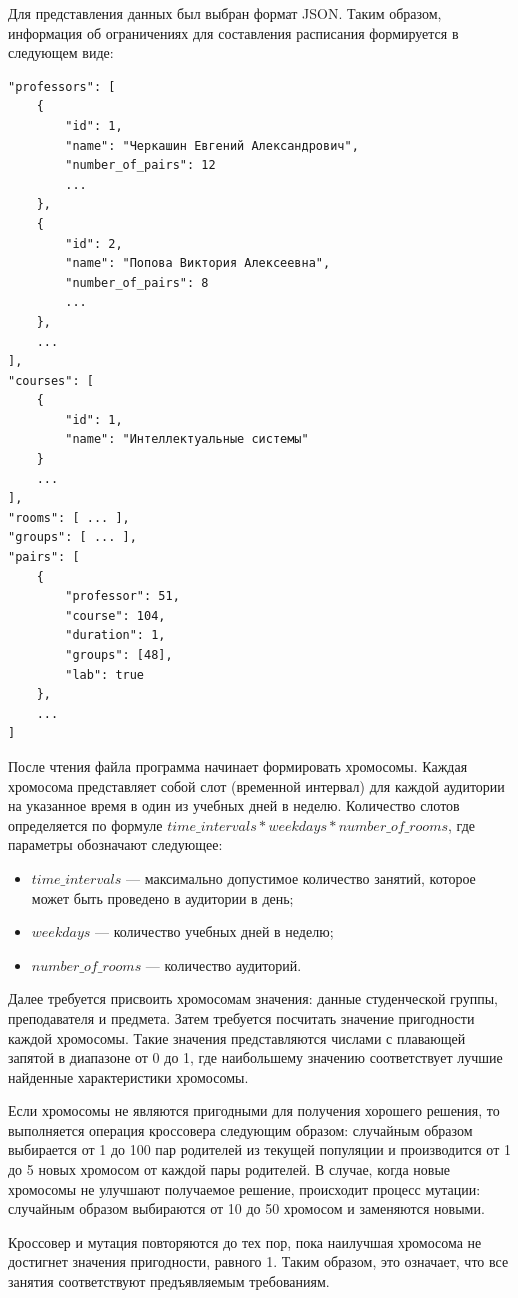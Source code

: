\documentclass[
]{aiitart}
\begin{document}
Для представления данных был выбран формат JSON. Таким образом, информация об ограничениях для составления расписания формируется в следующем виде:
\begin{verbatim}
"professors": [
    {
        "id": 1,
        "name": "Черкашин Евгений Александрович",
        "number_of_pairs": 12
        ...
    },
    {
        "id": 2,
        "name": "Попова Виктория Алексеевна",
        "number_of_pairs": 8
        ...
    },
    ...
],
"courses": [
    {
        "id": 1,
        "name": "Интеллектуальные системы"
    }
    ...
],
"rooms": [ ... ], 
"groups": [ ... ],
"pairs": [
    {
        "professor": 51,
        "course": 104,
        "duration": 1,
        "groups": [48],
        "lab": true
    },
    ...
]
\end{verbatim}

После чтения файла программа начинает формировать хромосомы.
Каждая хромосома представляет собой слот (временной интервал) для каждой аудитории на указанное время в один из учебных дней в неделю.
Количество слотов определяется по формуле $time\_intervals * weekdays * number\_of\_rooms$, где параметры обозначают следующее:
\begin{itemize}
    \item $time\_intervals$ --- максимально допустимое количество занятий, которое может быть проведено в аудитории в день;
    \item $weekdays$ --- количество учебных дней в неделю;
    \item $number\_of\_rooms$ --- количество аудиторий.
\end{itemize}

Далее требуется присвоить хромосомам значения: данные студенческой группы, преподавателя и предмета. Затем требуется посчитать значение пригодности каждой хромосомы. Такие значения представляются числами с плавающей запятой в диапазоне от 0 до 1, где наибольшему значению соответствует лучшие найденные характеристики хромосомы. 

Если хромосомы не являются пригодными для получения хорошего решения, то выполняется операция кроссовера следующим образом: случайным образом выбирается от 1 до 100 пар родителей из текущей популяции и производится от 1 до 5 новых хромосом от каждой пары родителей. В случае, когда новые хромосомы не улучшают получаемое решение, происходит процесс мутации: случайным образом выбираются от 10 до 50 хромосом и заменяются новыми.

Кроссовер и мутация повторяются до тех пор, пока наилучшая хромосома не достигнет значения пригодности, равного 1. Таким образом, это означает, что все занятия соответствуют предъявляемым требованиям. 
\end{document}

